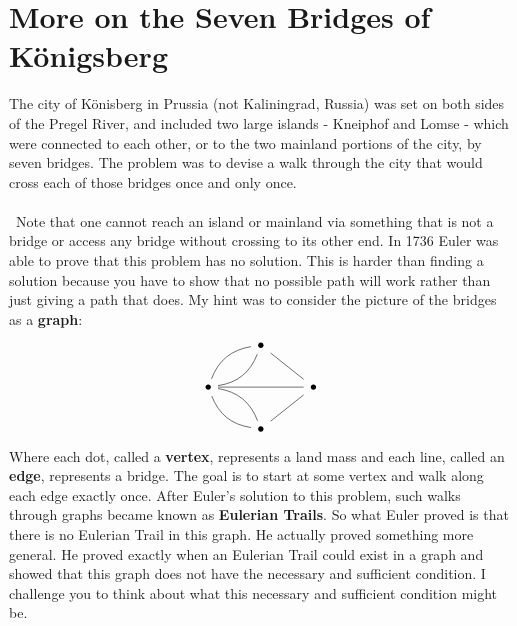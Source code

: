 \documentclass[11pt]{article}  %
\theoremstyle{definition}
\theoremstyle{remark}
\newcounter{solution} \setcounter{solution}{1}
\begin{document}
\section*{More on the Seven Bridges of K\"onigsberg}
The city of K\"onisberg in Prussia (not Kaliningrad, Russia) was set on both sides of the Pregel River, and included two large islands - Kneiphof and Lomse - which were connected to each other, or to the two mainland portions of the city, by seven bridges. The problem was to devise a walk through the city that would cross each of those bridges once and only once.
\ \\ \
\ \\ \
\noindent Note that one cannot reach an island or mainland via something that is not a bridge or access any bridge without crossing to its other end. In 1736 Euler was able to prove that this problem has no solution. This is harder than finding a solution because you have to show that no possible path will work rather than just giving a path that does. My hint was to consider the picture of the bridges as a {\bf graph}:
\[
\begin{tikzcd}
&\bullet \ar[ld, bend right, dash] \ar[ld, bend left, dash] \ar[rd, dash]&\\
\bullet \ar[rr, dash] \ar[rd, bend right, dash] \ar[rd, bend left, dash] &&\bullet \ar[ld, dash]\\
&\bullet&
\end{tikzcd}
\]
Where each dot, called a {\bf vertex}, represents a land mass and each line, called an {\bf edge}, represents a bridge. The goal is to start at some vertex and walk along each edge exactly once. After Euler's solution to this problem, such walks through graphs became known as {\bf Eulerian Trails}. So what Euler proved is that there is no Eulerian Trail in this graph. He actually proved something more general. He proved exactly when an Eulerian Trail could exist in a graph and showed that this graph does not have the necessary and sufficient condition. I challenge you to think about what this necessary and sufficient condition might be.
\end{document}
